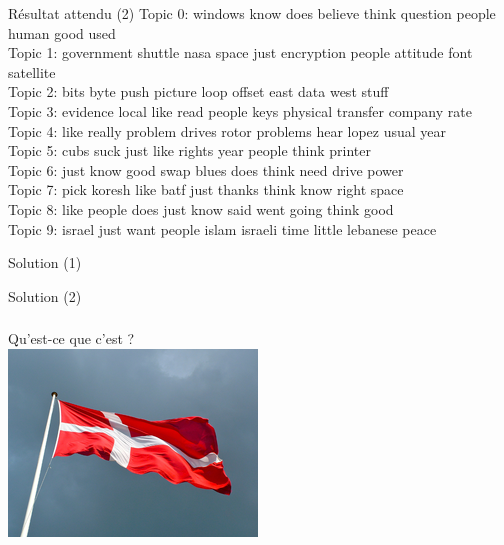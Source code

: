\documentclass[11pt]{beamer}
\newenvironment{slide}[1]{%
\begin{frame}[environment=slide]
\frametitle{#1}
}{%
\end{frame}
}
\newcommand{\Pythonsmall}[1]{
	{\scriptsize }
}
\begin{document}
\begin{frame}{Résultat attendu (2)}
\vspace{-0.1cm}Topic 0: windows know does believe think question people human good used\\

Topic 1: government shuttle nasa space just encryption people attitude font satellite\\

Topic 2: bits byte push picture loop offset east data west stuff\\

Topic 3: evidence local like read people keys physical transfer company rate\\

Topic 4: like really problem drives rotor problems hear lopez usual year\\

Topic 5: cubs suck just like rights year people think printer\\

Topic 6: just know good swap blues does think need drive power\\

Topic 7: pick koresh like batf just thanks think know right space\\

Topic 8: like people does just know said went going think good\\

Topic 9: israel just want people islam israeli time little lebanese peace\\

\end{frame}

\begin{frame}{Solution (1)}
\Pythonsmall{ex601}
\end{frame}

\begin{frame}{Solution (2)}
\Pythonsmall{ex602}
\end{frame}


\begin{slide}{}
	Qu'est-ce que c'est ?\\ \vspace{0.2cm}
	\includegraphics[scale=1]{danish_flag.png}
\end{slide}
\end{document}
